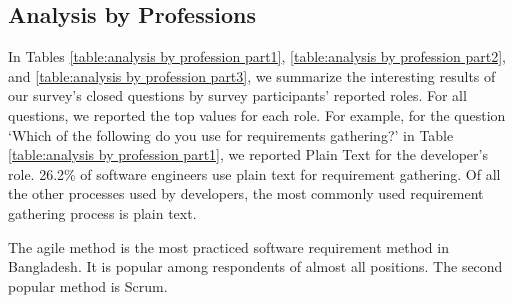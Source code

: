 \subsection{Analysis by Professions}
\label{analyze_by_professions}
In Tables \ref{table:analysis by profession part1}, \ref{table:analysis by profession part2}, and \ref{table:analysis by profession part3}, we summarize the interesting results of our survey's closed questions by survey participants' reported roles. For all questions, we reported the top values for each role. For example, for the question ‘Which of the following do you use for requirements gathering?’ in Table \ref{table:analysis by profession part1}, we reported Plain Text for the developer's role. 26.2\% of software engineers use plain text for requirement gathering. Of all the other processes used by developers, the most commonly used requirement gathering process is plain text.





The agile method is the most practiced software requirement method in Bangladesh. It is popular among respondents of almost all positions. The second popular method is Scrum.


